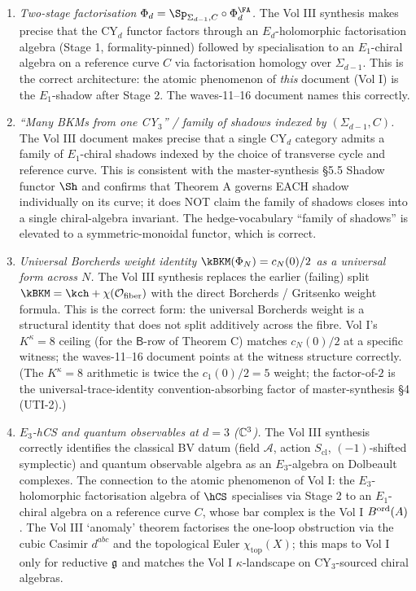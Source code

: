 \begin{enumerate}
\item \emph{Two-stage factorisation $\Phi_d = \Sp_{\Sigma_{d-1}, C}
\circ \Phi^{\FA}_d$.} The Vol III synthesis makes precise that the
CY$_d$ functor factors through an $E_d$-holomorphic factorisation
algebra (Stage 1, formality-pinned) followed by specialisation to an
$E_1$-chiral algebra on a reference curve $C$ via factorisation homology
over $\Sigma_{d-1}$. This is the correct architecture: the atomic
phenomenon of \emph{this} document (Vol I) is the $E_1$-shadow after
Stage 2. The waves-11--16 document names this correctly.

\item \emph{``Many BKMs from one CY$_3$'' / family of shadows indexed
by $(\Sigma_{d-1}, C)$.} The Vol III document makes precise that a
single CY$_d$ category admits a family of $E_1$-chiral shadows indexed
by the choice of transverse cycle and reference curve. This is
consistent with the master-synthesis §5.5 Shadow functor $\Sh$ and
confirms that Theorem A governs EACH shadow individually on its curve;
it does NOT claim the family of shadows closes into a single
chiral-algebra invariant. The hedge-vocabulary ``family of shadows'' is
elevated to a symmetric-monoidal functor, which is correct.

\item \emph{Universal Borcherds weight identity $\kBKM(\Phi_N) =
c_N(0)/2$ as a universal form across $N$.} The Vol III synthesis
replaces the earlier (failing) split
$\kBKM = \kch + \chi(\mathcal{O}_{\mathrm{fiber}})$ with the
direct Borcherds / Gritsenko weight formula. This is the correct form:
the universal Borcherds weight is a structural identity that does not
split additively across the fibre. Vol I's $K^\kappa = 8$ ceiling (for
the $\mathsf{B}$-row of Theorem C) matches $c_N(0)/2$ at a specific
witness; the waves-11--16 document points at the witness structure
correctly. (The $K^\kappa = 8$ arithmetic is twice the $c_1(0)/2 = 5$
weight; the factor-of-$2$ is the universal-trace-identity
convention-absorbing factor of master-synthesis §4 (UTI-2).)

\item \emph{$E_3$-hCS and quantum observables at $d = 3$ ($\mathbb{C}^3$).}
The Vol III synthesis correctly identifies the classical BV datum
(field $\mathcal{A}$, action $S_{\mathrm{cl}}$, $(-1)$-shifted
symplectic) and quantum observable algebra as an $E_3$-algebra on
Dolbeault complexes. The connection to the atomic phenomenon of Vol I:
the $E_3$-holomorphic factorisation algebra of $\hCS$ specialises via
Stage 2 to an $E_1$-chiral algebra on a reference curve $C$, whose
bar complex is the Vol I $B^{\mathrm{ord}}(A)$. The Vol III `anomaly' theorem
factorises the one-loop obstruction via the cubic Casimir $d^{abc}$
and the topological Euler $\chi_{\mathrm{top}}(X)$; this maps to Vol I
only for reductive $\mathfrak{g}$ and matches the Vol I $\kappa$-landscape on
CY$_3$-sourced chiral algebras.
\end{enumerate}

